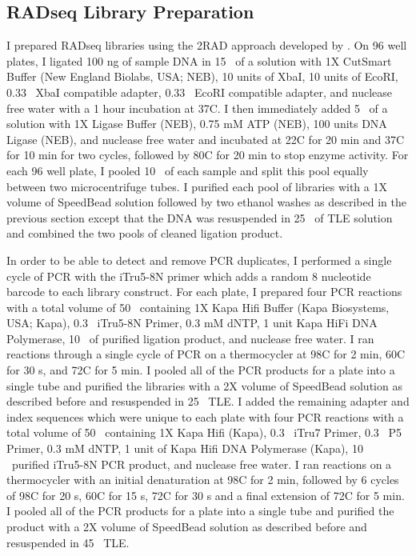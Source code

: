 \subsection{RADseq Library Preparation}
I prepared RADseq libraries using the 2RAD approach developed by \cite{bayona-vasquez2019}. 
On 96 well plates, I ligated 100 ng of sample DNA in 15 \uL\ of a solution with 
1X CutSmart Buffer (New England Biolabs, USA; NEB), 10 units of XbaI,
10 units of EcoRI, 0.33 \uM\ XbaI compatible adapter, 0.33 \uM\ EcoRI compatible adapter,
and nuclease free water with a 1 hour incubation at 37\degree C. 
I then immediately added 5 \uL\ of a solution with 1X Ligase Buffer (NEB),
0.75 mM ATP (NEB), 100 units DNA Ligase (NEB), and nuclease free water 
and incubated at 22\degree C for 20 min and 37\degree C for 10 min for two cycles, 
followed by 80\degree C for 20 min to stop enzyme activity.
For each 96 well plate, I pooled 10 \uL\ of each sample and split this pool 
equally between two microcentrifuge tubes.
I purified each pool of libraries with a 1X volume of SpeedBead solution followed 
by two ethanol washes as described in the previous section except that the DNA 
was resuspended in 25 \uL\ of TLE solution and combined the two pools of cleaned 
ligation product. 

In order to be able to detect and remove PCR duplicates, I performed a single   
cycle of PCR with the iTru5-8N primer which adds a random 8 nucleotide barcode to 
each library construct.  
For each plate, I prepared four PCR reactions with a total volume of 
50 \uL\ containing 1X Kapa Hifi Buffer (Kapa Biosystems, USA; Kapa),
0.3 \uM\ iTru5-8N Primer, 0.3 mM dNTP, 1 unit Kapa HiFi DNA Polymerase,
10 \uL\ of purified ligation product, and nuclease free water.
I ran reactions through a single cycle of PCR on a thermocycler at 98\degree C for 2 min, 
60\degree C for 30 s, and 72\degree C for 5 min. 
I pooled all of the PCR products for a plate into a single tube and purified the
libraries with a 2X volume of SpeedBead solution as described before and 
resuspended in 25 \uL\ TLE.
I added the remaining adapter and index sequences which were unique to each plate with four PCR
reactions with a total volume of 50 \uL\ containing 1X Kapa Hifi (Kapa),
0.3 \uM\ iTru7 Primer, 0.3 \uM\ P5 Primer, 0.3 mM dNTP, 1 unit of Kapa Hifi DNA Polymerase (Kapa),
10 \uL\ purified iTru5-8N PCR product, and nuclease free water.
I ran reactions on a thermocycler with an initial denaturation at 98\degree C for 2 min, 
followed by 6 cycles of 98\degree C for 20 s, 60\degree C for 15 s, 72\degree C 
for 30 s and a final extension of 72\degree C for 5 min.
I pooled all of the PCR products for a plate into a single tube and purified the
product with a 2X volume of SpeedBead solution as described before and 
resuspended in 45 \uL\ TLE.

